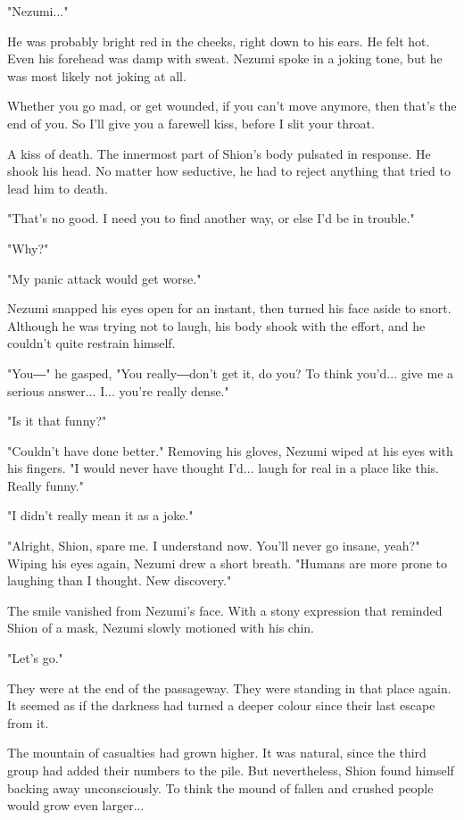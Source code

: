 "Nezumi..."

He was probably bright red in the cheeks, right down to his ears. He
felt hot. Even his forehead was damp with sweat. Nezumi spoke in a
joking tone, but he was most likely not joking at all.

Whether you go mad, or get wounded, if you can't move anymore, then
that's the end of you. So I'll give you a farewell kiss, before I slit
your throat.

A kiss of death. The innermost part of Shion's body pulsated in
response. He shook his head. No matter how seductive, he had to reject
anything that tried to lead him to death.

"That's no good. I need you to find another way, or else I'd be in
trouble."

"Why?"

"My panic attack would get worse."

Nezumi snapped his eyes open for an instant, then turned his face aside
to snort. Although he was trying not to laugh, his body shook with the
effort, and he couldn't quite restrain himself.

"You―" he gasped, "You really―don't get it, do you? To think you'd...
give me a serious answer... I... you're really dense."

"Is it that funny?"

"Couldn't have done better." Removing his gloves, Nezumi wiped at his
eyes with his fingers. "I would never have thought I'd... laugh for real
in a place like this. Really funny."

"I didn't really mean it as a joke."

"Alright, Shion, spare me. I understand now. You'll never go insane,
yeah?" Wiping his eyes again, Nezumi drew a short breath. "Humans are
more prone to laughing than I thought. New discovery."

The smile vanished from Nezumi's face. With a stony expression that
reminded Shion of a mask, Nezumi slowly motioned with his chin.

"Let's go."

They were at the end of the passageway. They were standing in that place
again. It seemed as if the darkness had turned a deeper colour since
their last escape from it.

The mountain of casualties had grown higher. It was natural, since the
third group had added their numbers to the pile. But nevertheless, Shion
found himself backing away unconsciously. To think the mound of fallen
and crushed people would grow even larger...

